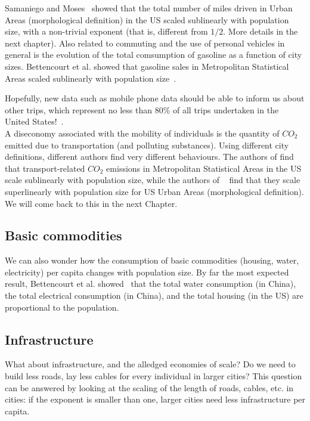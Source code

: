 Samaniego and Moses~\cite{Samaniego:2008} showed that the total number of miles
driven in Urban Areas (morphological definition) in the US scaled sublinearly
with population size, with a non-trivial exponent (that is, different from
$1/2$. More details in the next chapter).  Also related to commuting and the use of
personal vehicles in general is the evolution of the total comsumption of
gasoline as a function of city sizes. Bettencourt et al. showed that gasoline
sales in Metropolitan Statistical Areas scaled sublinearly with population
size~\cite{Bettencourt:2007}. 

Hopefully, new data such as mobile phone data should be
able to inform us about other trips, which represent no less than 80\% of all
trips undertaken in the United States!~\cite{FHWA-PL-11-022}.\\

A diseconomy associated with the mobility of individuals is the
quantity of $CO_2$ emitted due to transportation (and polluting substances).
Using different city definitions, different authors find very different
behaviours. The authors of \cite{Fragkias:2013} find that transport-related
$CO_2$ emissions in Metropolitan Statistical Areas in the US scale sublinearly
with population size, while the authors of
~\cite{Louf:2014_mobility,Oliveira:2014} find that they scale superlinearly with
population size for US Urban Areas (morphological definition). We will come back
to this in the next Chapter.


\subsection{Basic commodities}
\label{sub:basic_commodities}

We can also wonder how the consumption of basic commodities (housing, water,
electricity) per capita changes with population size. By far the most expected
result, Bettencourt et al. showed~\cite{Bettencourt:2007} that the total water
consumption (in China), the total electrical consumption (in China),  and the
total housing (in the US) are proportional to the population.\\


\subsection{Infrastructure}
\label{sub:infrastructure}

What about infrastructure, and the alledged economies of scale? Do we need to build less
roads, lay less cables for every individual in larger cities? This question can
be answered by looking at the scaling of the length of roads, cables, etc. in
cities: if the exponent is smaller than one, larger cities need less
infrastructure per capita.

